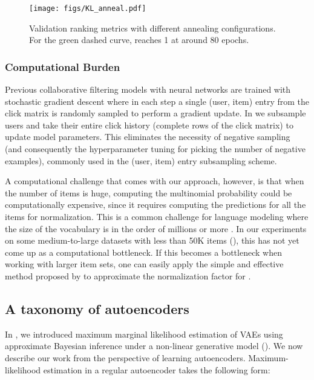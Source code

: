 \documentclass[sigconf]{acmart}
\begin{document}
\begin{figure}[!ht]
  \centering
  \texttt{[image: figs/KL\_anneal.pdf]}
  \caption{Validation ranking metrics with different annealing configurations. For the green dashed curve,  reaches 1 at around 80 epochs.}
  \label{fig:kl_anneal}
\end{figure}

\subsubsection{Computational Burden} Previous collaborative filtering models with 
neural networks \citep{he2017neural,wu2016collaborative} are trained with stochastic gradient descent
where in each step a single (user, item) entry from the click matrix is randomly sampled to perform a gradient update. 
In  we subsample users and take their entire click history (complete rows of the click matrix) to update model parameters.
This eliminates the necessity of negative sampling (and consequently the hyperparameter tuning for picking the number of negative examples), commonly used in the (user, item) entry subsampling scheme. 

A computational challenge that comes with our approach, however, is that when the number of items is huge, computing the 
multinomial probability  could be computationally expensive, since it requires computing the predictions 
for all the items for normalization. This is a common challenge for language modeling where the size of 
the vocabulary is in the order of millions or more \citep{mikolov2013distributed}. In our experiments on some medium-to-large 
datasets with less than 50K items (), this has not yet come up as a 
computational bottleneck. 
If this becomes a bottleneck when working with larger item sets, one can easily apply the
simple and effective method proposed by \citet{pmlr-v54-botev17a} to approximate the normalization 
factor for .


\subsection{A taxonomy of autoencoders} \label{sec:mle}

In , we introduced maximum marginal likelihood estimation of \glspl{VAE} using 
approximate Bayesian inference under a non-linear generative model (). 
We now describe our work from the perspective of learning autoencoders.  
Maximum-likelihood estimation in a regular autoencoder takes the following form:
\end{document}
